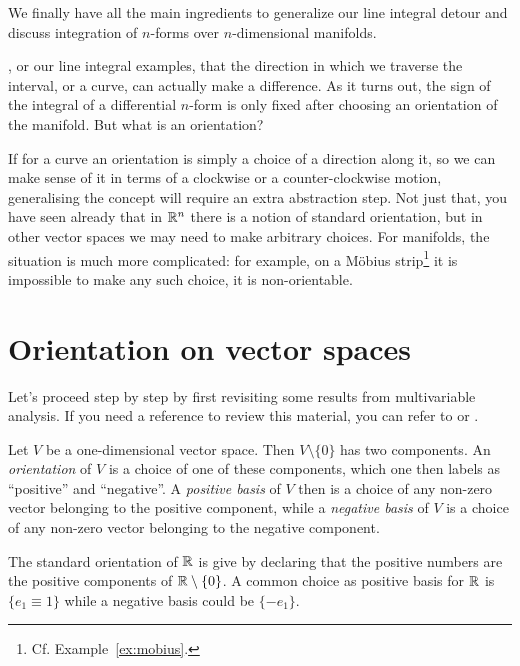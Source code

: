 We finally have all the main ingredients to generalize our line integral detour and discuss integration of $n$-forms over $n$-dimensional manifolds.

, or our line integral examples, that the direction in which we traverse the interval, or a curve, can actually make a difference.
As it turns out, the sign of the integral of a differential $n$-form is only fixed after choosing an orientation of the manifold.
But what is an orientation?

If for a curve an orientation is simply a choice of a direction along it, so we can make sense of it in terms of a clockwise or a counter-clockwise motion, generalising the concept will require an extra abstraction step.
Not just that, you have seen already that in $\mathbb{R}^n$ there is a notion of standard orientation, but in other vector spaces we may need to make arbitrary choices.
For manifolds, the situation is much more complicated: for example, on a M\"obius strip\footnote{Cf. Example~\ref{ex:mobius}.} it is impossible to make any such choice, it is non-orientable.

\section{Orientation on vector spaces}
Let's proceed step by step by first revisiting some results from multivariable analysis. If you need a reference to review this material, you can refer to \cite[Chapter 6.2]{book:abrahammarsdenratiu} or \cite[Chapters 21.1-21.2]{book:tu}.

\begin{definition}
  Let $V$ be a one-dimensional vector space. Then $V\setminus\{0\}$ has two components.
  An \emph{orientation} of $V$ is a choice of one of these components, which one then labels as ``positive'' and ``negative''.
  A \emph{positive basis} of $V$ then is a choice of any non-zero vector belonging to the positive component, while a \emph{negative basis} of $V$ is a choice of any non-zero vector belonging to the negative component.
\end{definition}

\begin{example}
  The standard orientation of $\mathbb{R}$ is give by declaring that the positive numbers are the positive components of $\mathbb{R}\setminus\{0\}$.
  A common choice as positive basis for $\mathbb{R}$ is $\{e_1 \equiv 1\}$ while a negative basis could be $\{-e_1\}$.
\end{example}

